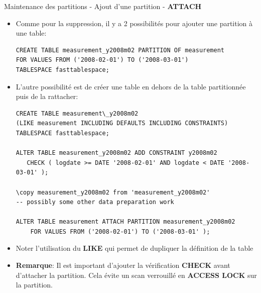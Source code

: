 
\begin{frame}[fragile]{Maintenance des partitions - Ajout d'une partition - \textbf{ATTACH}}

   \begin{itemize}
      \item Comme pour la suppression, il y a 2 possibilités pour ajouter une partition à une table:
\begin{tiny}
\begin{Verbatim}[commandchars=\\\{\}]
CREATE TABLE measurement_y2008m02 PARTITION OF measurement
FOR VALUES FROM ('2008-02-01') TO ('2008-03-01')
TABLESPACE fasttablespace;
\end{Verbatim}
\end{tiny}
      \item L'autre possibilité est de créer une table en dehors de la table partitionnée puis de la rattacher:
\begin{tiny}
\begin{Verbatim}[commandchars=\#\{\}]
CREATE TABLE measurement\_y2008m02
(LIKE measurement INCLUDING DEFAULTS INCLUDING CONSTRAINTS)
TABLESPACE fasttablespace;

ALTER TABLE measurement_y2008m02 ADD CONSTRAINT y2008m02
   CHECK ( logdate >= DATE '2008-02-01' AND logdate < DATE '2008-03-01' );

\copy measurement_y2008m02 from 'measurement_y2008m02'
-- possibly some other data preparation work

ALTER TABLE measurement ATTACH PARTITION measurement_y2008m02
    FOR VALUES FROM ('2008-02-01') TO ('2008-03-01' );
\end{Verbatim}
\end{tiny}
      \item Noter l'utilisation du \textbf{LIKE} qui permet de dupliquer la définition de la table
      \item \textbf{Remarque}: Il est important d'ajouter la vérification \textbf{CHECK} avant d'attacher la partition. Cela évite un scan verrouillé en \textbf{ACCESS LOCK} sur la partition.
   \end{itemize}

\end{frame}


